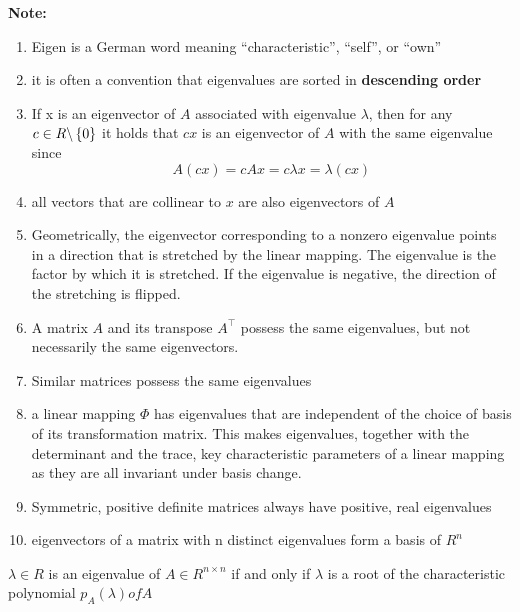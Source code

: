 \noindent\textbf{Note:}
\begin{enumerate}
    \item Eigen is a German word meaning “characteristic”, “self”, or “own”

    \item it is often a convention that eigenvalues are sorted in \textbf{descending order}

    \item If x is an eigenvector of $A$ associated with eigenvalue $\lambda$, then for any $c \in  R\backslash \left\{0\right\}$ it holds that $cx$ is an eigenvector of $A$ with the same eigenvalue since 
    \[
        A(cx) = cAx = c\lambda x = \lambda (cx)
    \]

    \item all vectors that are collinear to $x$ are also eigenvectors of $A$

    \item Geometrically, the eigenvector corresponding to a nonzero eigenvalue points in a direction that is stretched by the linear mapping. The eigenvalue is the factor by which it is stretched. If the eigenvalue is negative, the direction of the stretching is flipped.

    \item A matrix $A$ and its transpose $A^\top$  possess the same eigenvalues, but not necessarily the same eigenvectors.

    \item Similar matrices possess the same eigenvalues

    \item a linear mapping $\Phi$ has eigenvalues that are independent of the choice of basis of its transformation matrix. This makes eigenvalues, together with the determinant and the trace, key characteristic parameters of a linear mapping as they are all invariant under basis change.

    \item Symmetric, positive definite matrices always have positive, real eigenvalues

    \item eigenvectors of a matrix with n distinct eigenvalues form a basis of $R^n$

\end{enumerate}

\begin{theorem}
    $\lambda  \in  R$ is an eigenvalue of $A \in  R^{n\times n}$ if and only if $\lambda$  is a root of the characteristic polynomial $p_A(\lambda ) of A$
\end{theorem}

